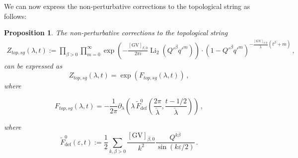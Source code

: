 \documentclass[a4paper,12pt,justification=centering]{article}
\numberwithin{equation}{section}
\theoremstyle{plain}%
\newtheorem{prop}[thm]{Proposition}
\theoremstyle{definition}
\begin{document}
 We can now express the non-perturbative corrections to the topological string as follows:
\begin{prop}\label{prop:correc}
The non-perturbative corrections to the topological string 
\begin{align} \label{Ztopsg}
 Z_{top,sg}(\lambda,t) :=   \prod_{\beta>0}  \prod_{m=0}^{\infty}  \exp\left(-\frac{[\textrm{GV}]_{\beta,0}}{2\pi i} \operatorname{Li}_2(Q'^{\beta} q'^m)\right) \cdot (1-Q'^{\beta} q'^m)^{-\frac{ [\textrm{GV}]_{\beta,0}}{\check{\lambda}}\left( t^{\beta}+m\right)}\,,
\end{align}
can be expressed as 
\begin{equation}
 Z_{top,sg}(\lambda,t)= \exp(F_{top,sg}(\lambda,t) )\,,
\end{equation}
where

\begin{equation}
F_{top,sg}(\lambda,t)=  -\frac{1}{2\pi} \partial_{\lambda} \left( \lambda \, \tilde{F}^{0}_{\textrm{def}} \left( \frac{2\pi}{\check{\lambda}}, \frac{t-1/2}{\check{\lambda}} \right)\right)\,,
\end{equation}

where 
\begin{equation}
\tilde{F}^{0}_{\textrm{def}}(\varepsilon,t):=\frac{1}{2} \sum_{k,\beta>0} \frac{[\textrm{GV}]_{\beta,0}}{k^2} \frac{Q^{k\beta}}{\sin(k\varepsilon/2)}\,.
\end{equation}

\end{prop}
\end{document}
